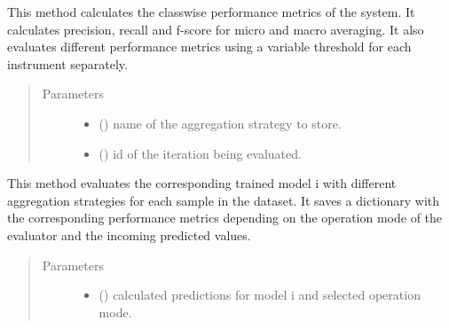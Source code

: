 \documentclass[letterpaper,10pt,english]{sphinxmanual}
\begin{document}
\begin{fulllineitems}
\begin{fulllineitems}
\label{\detokenize{evaluate:evaluate.Evaluator.classwise_performance_metrics}}
This method calculates the classwise performance metrics of the system. It
calculates precision, recall and f-score for micro and macro averaging.
It also evaluates different performance metrics using a variable threshold 
for each instrument separately.
\begin{quote}\begin{description}
\item[{Parameters}] \leavevmode\begin{itemize}
\item {} 
 () \textendash{} name of the aggregation strategy to store.

\item {} 
 () \textendash{} id of the iteration being evaluated.

\end{itemize}

\end{description}\end{quote}

\end{fulllineitems}


\begin{fulllineitems}
\label{\detokenize{evaluate:evaluate.Evaluator.evaluate}}
This method evaluates the corresponding trained model i with different
aggregation strategies for each sample in the dataset. It saves a dictionary
with the corresponding performance metrics depending on the operation mode
of the evaluator and the incoming predicted values.
\begin{quote}\begin{description}
\item[{Parameters}] \leavevmode\begin{itemize}
\item {} 
 () \textendash{} calculated predictions for model i and selected operation mode.


\end{itemize}
\end{description}
\end{quote}
\end{fulllineitems}
\end{fulllineitems}
\end{document}
